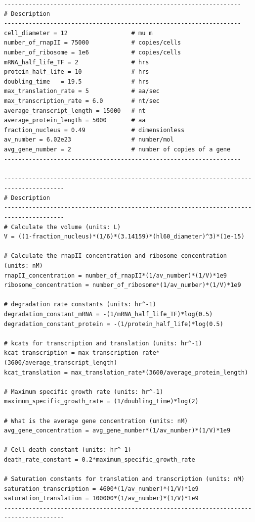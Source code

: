 \begin{lstlisting}
-------------------------------------------------------------------
# Description
-------------------------------------------------------------------
cell_diameter = 12                	# mu m
number_of_rnapII = 75000          	# copies/cells
number_of_ribosome = 1e6          	# copies/cells
mRNA_half_life_TF = 2             	# hrs
protein_half_life = 10            	# hrs
doubling_time 	= 19.5         		# hrs
max_translation_rate = 5          	# aa/sec
max_transcription_rate = 6.0       	# nt/sec
average_transcript_length = 15000 	# nt
average_protein_length = 5000     	# aa
fraction_nucleus = 0.49           	# dimensionless
av_number = 6.02e23               	# number/mol
avg_gene_number = 2               	# number of copies of a gene
-------------------------------------------------------------------

---------------------------------------------------------------------------------------
# Description
---------------------------------------------------------------------------------------
# Calculate the volume (units: L)
V = ((1-fraction_nucleus)*(1/6)*(3.14159)*(hl60_diameter)^3)*(1e-15)

# Calculate the rnapII_concentration and ribosome_concentration (units: nM)
rnapII_concentration = number_of_rnapII*(1/av_number)*(1/V)*1e9
ribosome_concentration = number_of_ribosome*(1/av_number)*(1/V)*1e9

# degradation rate constants (units: hr^-1)
degradation_constant_mRNA = -(1/mRNA_half_life_TF)*log(0.5)
degradation_constant_protein = -(1/protein_half_life)*log(0.5)

# kcats for transcription and translation (units: hr^-1)
kcat_transcription = max_transcription_rate*(3600/average_transcript_length)
kcat_translation = max_translation_rate*(3600/average_protein_length)

# Maximum specific growth rate (units: hr^-1)
maximum_specific_growth_rate = (1/doubling_time)*log(2)

# What is the average gene concentration (units: nM)
avg_gene_concentration = avg_gene_number*(1/av_number)*(1/V)*1e9

# Cell death constant (units: hr^-1)
death_rate_constant = 0.2*maximum_specific_growth_rate

# Saturation constants for translation and transcription (units: nM)
saturation_transcription = 4600*(1/av_number)*(1/V)*1e9
saturation_translation = 100000*(1/av_number)*(1/V)*1e9
---------------------------------------------------------------------------------------

\end{lstlisting}

